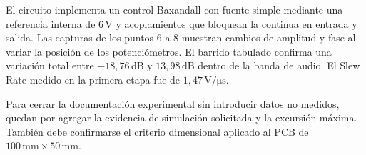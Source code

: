 \documentclass{article}
\begin{document}
El circuito implementa un control Baxandall con fuente simple mediante una referencia interna
de \(6\,\mathrm{V}\) y acoplamientos que bloquean la continua en entrada y salida. Las
capturas de los puntos 6 a 8 muestran cambios de amplitud y fase al variar la posición de los
potenciómetros. El barrido tabulado confirma una variación total entre
\(-18{,}76\,\mathrm{dB}\) y \(13{,}98\,\mathrm{dB}\) dentro de la banda de audio. El
Slew Rate medido en la primera etapa fue de \(1{,}47\,\mathrm{V/\mu s}\).

Para cerrar la documentación experimental sin introducir datos no medidos, quedan por agregar
la evidencia de simulación solicitada y la excursión máxima. También debe
confirmarse el criterio dimensional aplicado al PCB de \(100\,\mathrm{mm}\times 50\,\mathrm{mm}\).
\end{document}
